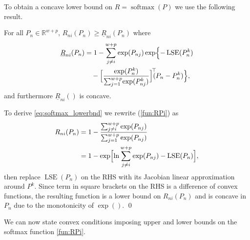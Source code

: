 \documentclass{ifacconf}
\DeclareMathOperator{\softmax}{softmax}
\DeclareMathOperator{\LSE}{LSE}
\begin{document}
To obtain a concave lower bound on $R = \softmax(P)$ we use the following result.

\begin{lem}\label{lem:softmax_symmetry}
For all $P_n\in \mathbb{R}^{w+p}$, $R_{ni}(P_n) \geq \underline{R}_{ni}(P_n)$ where
\begin{align}
\underline{R}_{ni}(P_n) &= 1 - \sum_{j\neq i}^{w+p} \exp(P_{nj}) \exp\Bigl\{-\LSE(P_n^k) 
\nonumber \\
&\quad - 
\Bigl[\frac{\exp(P_{n}^k)}{\sum_{j =1}^{w+p} \!\exp(P_{nj}^k)}\Bigr]^{\!\top}\!\!\!(P_{n}-P_{n}^k)
\Bigr\},
\label{eq:softmax_lowerbnd}
\end{align}
and furthermore $\underline{R}_{ni}()$ is concave.
\end{lem}

\begin{pf}
To derive \eqref{eq:softmax_lowerbnd} we rewrite (\ref{fun:RPi}) as
\begin{align*}
R_{ni}(P_{n}) 
&= 1 - \frac{\sum_{j\neq i}^{w+p} \exp(P_{nj})}{\sum_{j=1}^{w+p} \exp(P_{nj})} 
\\
&= 1 - \exp\Bigl[ \ln \sum_{j\neq i}^{w+p} \exp(P_{nj}) - \LSE(P_{n}) \Bigr],
\end{align*}
then replace $\LSE(P_{n})$ on the RHS with its Jacobian linear approximation around $P^k$. Since term in square brackets on the RHS is a difference of  convex functions, the resulting function is a lower bound on $R_{ni}(P_{n})$ and is concave in $P_n$ due to the monotonicity of $\exp()$.
\qed\end{pf}



We can now state convex conditions imposing upper and lower bounds on the softmax function  \eqref{fun:RPi}.
\end{document}
